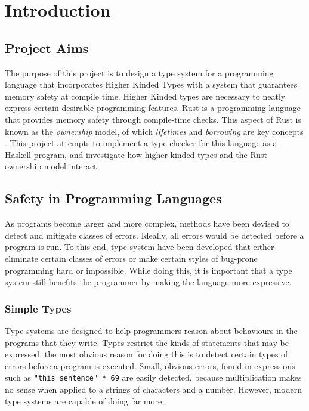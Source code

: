 \chapter{Introduction}\label{sec:intro}

\section{Project Aims}
The purpose of this project is to design a type system for a programming
language that incorporates Higher Kinded Types with a system that guarantees
memory safety at compile time. Higher Kinded types are necessary to neatly
express certain desirable programming features. Rust is a programming language
that provides memory safety through compile-time checks. This aspect of Rust is
known as the \textit{ownership} model, of which \textit{lifetimes} and
\textit{borrowing} are key concepts \cite{rust}. This project attempts to
implement a type checker for this language as a Haskell program, and
investigate how higher kinded types and the Rust ownership model interact.

\section{Safety in Programming Languages}
As programs become larger and more complex, methods have been devised to detect
and mitigate classes of errors. Ideally, all errors would be detected before a
program is run. To this end, type system have been developed that either
eliminate certain classes of errors or make certain styles of bug-prone
programming hard or impossible. While doing this, it is important that a type
system still benefits the programmer by making the language more expressive.

\subsection{Simple Types}
Type systems are designed to help programmers reason about behaviours in the
programs that they write. Types restrict the kinds of statements that may be
expressed, the most obvious reason for doing this is to detect certain types of
errors before a program is executed. Small, obvious errors, found in
expressions such as \lstinline{"this sentence" * 69} are easily detected,
because multiplication makes no sense when applied to a strings of characters
and a number.  However, modern type systems are capable of doing far more. 


